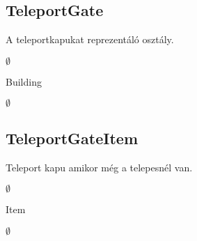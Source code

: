 \subsection{TeleportGate}
\begin{class-template-responsibility}
A teleportkapukat reprezentáló osztály.
\end{class-template-responsibility}
\begin{class-template-interface}
$\emptyset$
\end{class-template-interface}
\begin{class-template-baseclass}
Building
\end{class-template-baseclass}
\begin{class-template-attribute}
\item[] $\emptyset$
\end{class-template-attribute}
\begin{class-template-method}
\end{class-template-method}


\subsection{TeleportGateItem}
\begin{class-template-responsibility}
Teleport kapu amikor még a telepesnél van.
\end{class-template-responsibility}
\begin{class-template-interface}
$\emptyset$
\end{class-template-interface}
\begin{class-template-baseclass}
Item
\end{class-template-baseclass}
\begin{class-template-attribute}
\item[] $\emptyset$
\end{class-template-attribute}
\begin{class-template-method}
\end{class-template-method}


